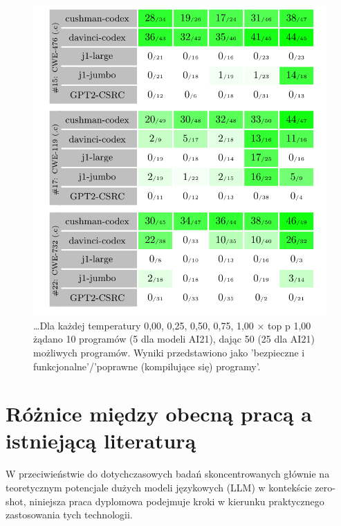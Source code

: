 \begin{figure}[ht]
\begin{minipage}[b]{0.45\textwidth}
        \includegraphics[width=\textwidth]{img/codex-results-2.png}
        \caption{\dots Dla każdej temperatury {0,00, 0,25, 0,50, 0,75, 1,00} × top p {1,00} żądano 10 programów (5 dla modeli AI21), dając 50 (25 dla AI21) możliwych programów. Wyniki przedstawiono jako 'bezpieczne i funkcjonalne'/'poprawne (kompilujące się) programy'.}
        \label{fig:second_image}
    \end{minipage}
\end{figure}


\section{Różnice między obecną pracą a istniejącą literaturą}

W przeciwieństwie do dotychczasowych badań skoncentrowanych głównie na teoretycznym potencjale dużych modeli językowych (LLM) w kontekście zero-shot, niniejsza praca dyplomowa podejmuje kroki w kierunku praktycznego zastosowania tych technologii. 

